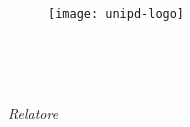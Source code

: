 \begin{titlepage}
    \begin{center}
        \begin{LARGE}
            \textbf{\myUni}\\
        \end{LARGE}

        \vspace{10pt}

        \begin{Large}
            \textsc{\myDepartment}\\
        \end{Large}

        \vspace{10pt}

        \begin{large}
            \textsc{\myFaculty}\\
        \end{large}

        \vspace{30pt}
        \begin{figure}[htbp]
            \centering
            \texttt{[image: unipd-logo]}
        \end{figure}
        \vspace{30pt}

        \begin{LARGE}
            \textbf{\myTitle}\\
        \end{LARGE}

        \vspace{10pt}

        \begin{large}
            \textsl{\myDegree}\\
        \end{large}

        \vspace{40pt}

        \begin{large}
            \begin{flushleft}
                \textit{Relatore}\\
                \vspace{5pt}
                \profTitle\ \myProf
            \end{flushleft}



\end{large}
\end{center}
\end{titlepage}
